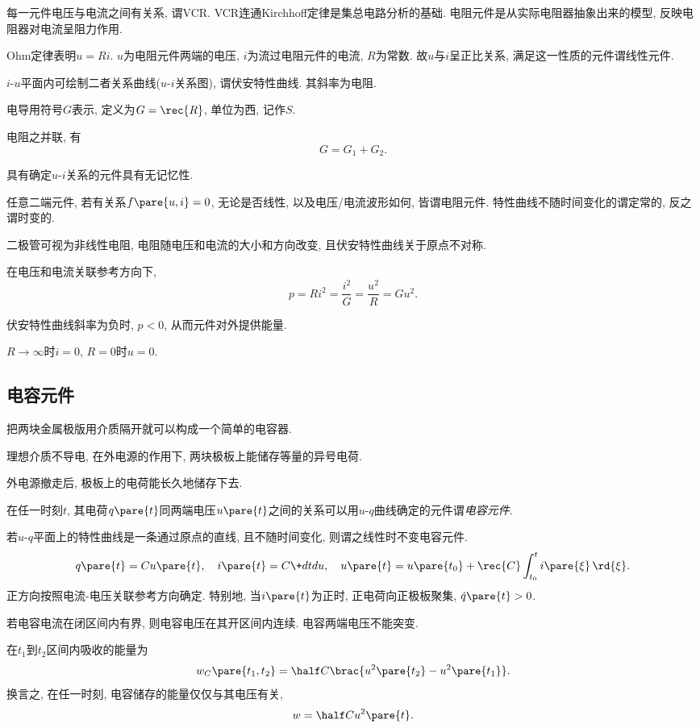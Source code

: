 \documentclass{ctexart}
\begin{document}
每一元件电压与电流之间有关系, 谓VCR. VCR连通Kirchhoff定律是集总电路分析的基础. 电阻元件是从实际电阻器抽象出来的模型, 反映电阻器对电流呈阻力作用.
\par
Ohm定律表明$u=Ri$. $u$为电阻元件两端的电压, $i$为流过电阻元件的电流, $R$为常数. 故$u$与$i$呈正比关系, 满足这一性质的元件谓线性元件.
\par
$i$-$u$平面内可绘制二者关系曲线($u$-$i$关系图), 谓伏安特性曲线. 其斜率为电阻.
\par
电导用符号$G$表示, 定义为$\displaystyle G = \rec{R}$, 单位为西, 记作$S$.
\begin{sample}
    \begin{ex}
        电阻之并联, 有
        \[ G = G_1 + G_2. \]
    \end{ex}
\end{sample}
\par
具有确定$u$-$i$关系的元件具有无记忆性.
\par
任意二端元件, 若有关系$f\pare{u,i} = 0$, 无论是否线性, 以及电压/电流波形如何, 皆谓电阻元件. 特性曲线不随时间变化的谓定常的, 反之谓时变的.
\par
二极管可视为非线性电阻, 电阻随电压和电流的大小和方向改变, 且伏安特性曲线关于原点不对称.
\par
在电压和电流关联参考方向下,
\[ p = Ri^2 = \frac{i^2}{G} = \frac{u^2}{R} = Gu^2. \]
\par
伏安特性曲线斜率为负时, $p<0$, 从而元件对外提供能量.
\par
$R\rightarrow \infty$时$i=0$, $R = 0$时$u = 0$. 


\subsection{电容元件} %
\label{sub:电容元件}

把两块金属极版用介质隔开就可以构成一个简单的电容器.
\par
理想介质不导电, 在外电源的作用下, 两块极板上能储存等量的异号电荷.
\par
外电源撤走后, 极板上的电荷能长久地储存下去.
\par
在任一时刻$t$, 其电荷$q\pare{t}$同两端电压$u\pare{t}$之间的关系可以用$u$-$q$曲线确定的元件谓\emph{电容元件}.
\par
若$u$-$q$平面上的特性曲线是一条通过原点的直线, 且不随时间变化, 则谓之线性时不变电容元件.
\[ q\pare{t} = Cu\pare{t}, \quad i\pare{t} = C\+dtdu,\quad u\pare{t} = u\pare{t_0} + \rec{C} \int_{t_0}^t i\pare{\xi}\,\rd{\xi}. \]
正方向按照电流-电压关联参考方向确定. 特别地, 当$i\pare{t}$为正时, 正电荷向正极板聚集, $\dot{q}\pare{t}>0$.
\par
若电容电流在闭区间内有界, 则电容电压在其开区间内连续. {\color{red}电容两端电压不能突变.}
\par
在$t_1$到$t_2$区间内吸收的能量为
\[ w_C\pare{t_1,t_2} = \half C\brac{u^2\pare{t_2} - u^2\pare{t_1}}. \]
换言之, 在任一时刻, 电容储存的能量仅仅与其电压有关,
\[ w = \half Cu^2\pare{t}. \]
\end{document}
